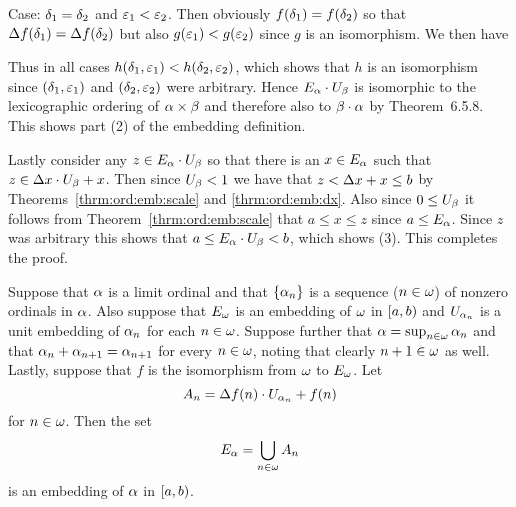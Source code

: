 {{    Case: $\delta_1 = \delta_2$ and $\varepsilon_1 < \varepsilon_2$.
    Then obviously $f(\delta_1) = f(\delta_2)$ so that $\Delta f(\delta_1) = \Delta f(\delta_2)$ but also $g(\varepsilon_1) < g(\varepsilon_2)$ since $g$ is an isomorphism.
    We then have
    
    Thus in all cases $h(\delta_1, \varepsilon_1) < h(\delta_2, \varepsilon_2)$, which shows that $h$ is an isomorphism since $(\delta_1, \varepsilon_1)$ and $(\delta_2, \varepsilon_2)$ were arbitrary.
    Hence $E_\alpha \cdot U_\beta$ is isomorphic to the lexicographic ordering of $\alpha \times \beta$ and therefore also to $\beta \cdot \alpha$ by Theorem~6.5.8.
    This shows part (2) of the embedding definition.

    Lastly consider any $z \in E_\alpha \cdot U_\beta$ so that there is an $x \in E_\alpha$ such that $z \in \Delta x \cdot U_\beta + x$.
    Then since $U_\beta < 1$ we have that $z < \Delta x + x \leq b$ by Theorems~\ref{thrm:ord:emb:scale} and \ref{thrm:ord:emb:dx}.
    Also since $0 \leq U_\beta$ it follows from Theorem~\ref{thrm:ord:emb:scale} that $a \leq x \leq z$ since $a \leq E_\alpha$.
    Since $z$ was arbitrary this shows that $a \leq E_\alpha \cdot U_\beta < b$, which shows (3).
    This completes the proof.
  }

  \begin{thrm}\label{thrm:ord:emb:sup}
    Suppose that $\alpha$ is a limit ordinal and that $\left\{ \alpha_n \right\}$ is a sequence ($n \in \omega$) of nonzero ordinals in $\alpha$.
    Also suppose that $E_\omega$ is an embedding of $\omega$ in $[a,b)$ and $U_{\alpha_n}$ is a unit embedding of $\alpha_n$ for each $n \in \omega$.
    Suppose further that $\alpha = \sup_{n \in \omega} \alpha_n$ and that $\alpha_n + \alpha_{n+1} = \alpha_{n+1}$ for every $n \in \omega$, noting that clearly $n+1 \in \omega$ as well.
    Lastly, suppose that $f$ is the isomorphism from $\omega$ to $E_\omega$.
    Let
    $$
    A_n = \Delta f(n) \cdot U_{\alpha_n} + f(n)
    $$
    for $n \in \omega$.
    Then the set
    $$
    E_\alpha = \bigcup_{n \in \omega} A_n
    $$
    is an embedding of $\alpha$ in $[a,b)$.
  \end{thrm}
  }
